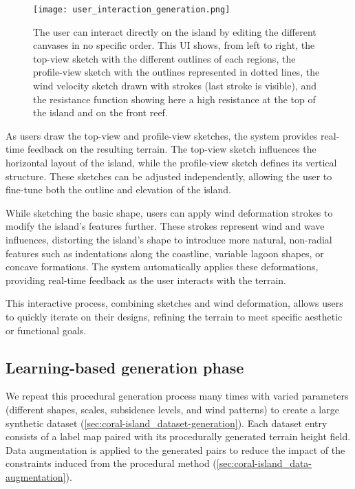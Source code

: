 \documentclass{egpubl}
\begin{document}
\begin{figure}
    \centering
    \texttt{[image: user\_interaction\_generation.png]}
    \caption{The user can interact directly on the island by editing the different canvases in no specific order. This UI shows, from left to right, the top-view sketch with the different outlines of each regions, the profile-view sketch with the outlines represented in dotted lines, the wind velocity sketch drawn with strokes (last stroke is visible), and the resistance function showing here a high resistance at the top of the island and on the front reef.}
    \label{fig:coral-island_wind-from-strokes-interaction}
\end{figure}

As users draw the top-view and profile-view sketches, the system provides real-time feedback on the resulting terrain. The top-view sketch influences the horizontal layout of the island, while the profile-view sketch defines its vertical structure. These sketches can be adjusted independently, allowing the user to fine-tune both the outline and elevation of the island.

While sketching the basic shape, users can apply wind deformation strokes to modify the island's features further. These strokes represent wind and wave influences, distorting the island's shape to introduce more natural, non-radial features such as indentations along the coastline, variable lagoon shapes, or concave formations. The system automatically applies these deformations, providing real-time feedback as the user interacts with the terrain.

This interactive process, combining sketches and wind deformation, allows users to quickly iterate on their designs, refining the terrain to meet specific aesthetic or functional goals.

\subsection{Learning-based generation phase}
\label{sec:coral-island_cGAN-phase}

We repeat this procedural generation process many times with varied parameters (different shapes, scales, subsidence levels, and wind patterns) to create a large synthetic dataset (\cref{sec:coral-island_dataset-generation}). Each dataset entry consists of a label map paired with its procedurally generated terrain height field. Data augmentation is applied to the generated pairs to reduce the impact of the constraints induced from the procedural method (\cref{sec:coral-island_data-augmentation}).
\end{document}
